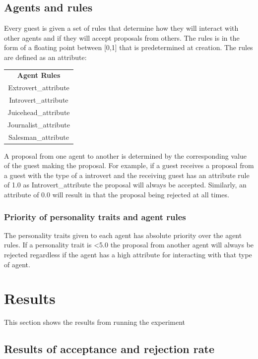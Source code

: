 \documentclass[a4paper,10pt]{article}
\begin{document}
\subsection{Agents and rules}
Every guest is given a set of rules that determine how they will interact with other agents and if they will accept proposals from others. The rules is in the form of a floating point between [0,1] that is predetermined at creation. The rules are defined as an attribute:

\begin{center}
\begin{tabular}{ |c| } 
 \hline
 \textbf{Agent Rules} \\
 Extrovert\_attribute \\
 Introvert\_attribute \\
 Juicehead\_attribute \\
 Journalist\_attribute \\
 Salesman\_attribute \\
 \hline
\end{tabular}
\end{center}

A proposal from one agent to another is determined by the corresponding value of the guest making the proposal. For example, if a guest receives a proposal from a guest with the type of a introvert and the receiving guest has an attribute rule of 1.0 as Introvert\_attribute the proposal will always be accepted. Similarly, an attribute of 0.0 will result in that the proposal being rejected at all times.

\subsubsection{Priority of personality traits and agent rules}
The personality traits given to each agent has absolute priority over the agent rules. If a personality trait is \textless 5.0 the proposal from another agent will always be rejected regardless if the agent has a high attribute for interacting with that type of agent. 

\section{Results}

This section shows the results from running the experiment

\subsection{Results of acceptance and rejection rate}
\end{document}
